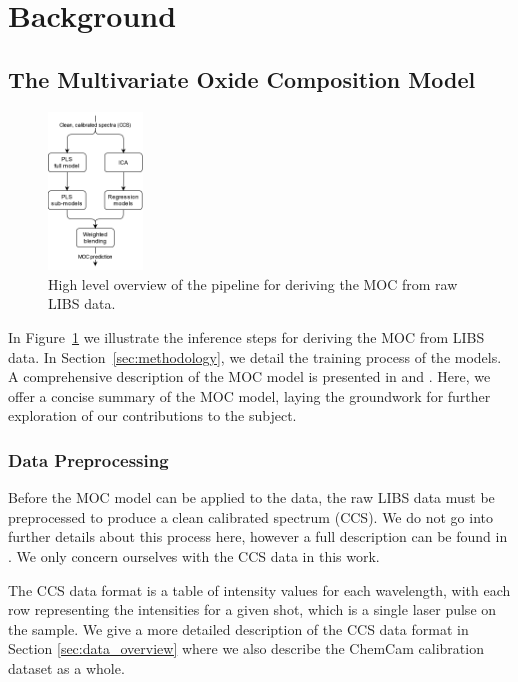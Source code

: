 \section{Background}\label{sec:background}
\subsection{The Multivariate Oxide Composition Model}\label{sec:moc}
\begin{figure}[ht]
    \centering
    \includegraphics[width=0.225\textwidth]{images/pipeline.png}
    \caption{High level overview of the pipeline for deriving the MOC from raw LIBS data.}
    \label{fig:libs_data_processing}
\end{figure}

In Figure~\ref{fig:libs_data_processing} we illustrate the inference steps for deriving the MOC from LIBS data.
In Section~\ref{sec:methodology}, we detail the training process of the models.
A comprehensive description of the MOC model is presented in \citet{cleggRecalibrationMarsScience2017} and \citet{andersonImprovedAccuracyQuantitative2017}.
Here, we offer a concise summary of the MOC model, laying the groundwork for further exploration of our contributions to the subject.

\subsubsection{Data Preprocessing}\label{sec:data_preprocessing}
Before the MOC model can be applied to the data, the raw LIBS data must be preprocessed to produce a clean calibrated spectrum (CCS).
We do not go into further details about this process here, however a full description can be found in \citet{wiensPreFlight3}.
We only concern ourselves with the CCS data in this work.

The CCS data format is a table of intensity values for each wavelength, with each row representing the intensities for a given shot, which is a single laser pulse on the sample.
We give a more detailed description of the CCS data format in Section \ref{sec:data_overview} where we also describe the ChemCam calibration dataset as a whole.

